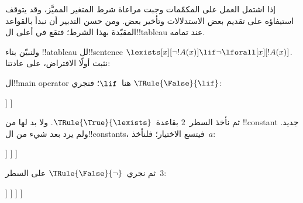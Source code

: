 \documentclass[../../../include/open-logic-section]{subfiles}
\begin{document}


\begin{ex}
إذا اشتمل العمل على المكمّمات وجبت مراعاة شرط المتغير المميَّز،
وقد يتوقف استيفاؤه على تقديم بعض الاستدلالات وتأخير بعض.
ومن حسن التدبير أن نبدأ بالقواعد المقيّدة بهذا الشرط؛ فتقع في أعلى
ال!!{tableau} عند تمامه.

ولنبيّن بناء !!a{tableau} لل!!{sentence}
$\lexists[x][\lnot !A(x)] \lif \lnot \lforall[x][!A(x)]$.
نثبت أولًا الافتراض، على عادتنا:
\begin{oltableau}
[\sFmla{\False}{\lexists[x][\lnot \formula{A}(x)]\lif \lnot
    \lforall[x][\formula{A}(x)]}, just=\TAss]
\end{oltableau}
ال!!{main operator} هنا~$\lif$؛ فنجري
$\TRule{\False}{\lif}$:
\begin{oltableau}
[\sFmla{\False}{\lexists[x][\lnot \formula{A}(x)]\lif \lnot
    \lforall[x][\formula{A}(x)]}, just=\TAss, checked
  [\sFmla{\True}{\lexists[x][\lnot \formula{A}(x)]},
    just={\TRule{\False}{\lif}[1]}
    [\sFmla{\False}{\lnot\lforall[x][\formula{A}(x)]},
      just={\TRule{\False}{\lif}[1]}]
  ]
]
\end{oltableau}
ثم نأخذ السطر~$2$ بقاعدة~$\TRule{\True}{\lexists}$.
ولا بد لها من !!{constant} جديد. ولم يرد بعد شيء من
ال!!{constant}s، فيتسع الاختيار؛ فلنأخذ~$a$:
\begin{oltableau}
[\sFmla{\False}{\lexists[x][\lnot \formula{A}(x)]\lif \lnot
    \lforall[x][\formula{A}(x)]}, just=\TAss, checked
  [\sFmla{\True}{\lexists[x][\lnot \formula{A}(x)]},
    just={\TRule{\False}{\lif}[1]}, checked
    [\sFmla{\False}{\lnot\lforall[x][\formula{A}(x)]},
      just={\TRule{\False}{\lif}[1]}
      [\sFmla{\True}{\lnot\formula{A}(a)}, just={\TRule{\True}{\lexists}[2]}]
    ]
  ]
]
\end{oltableau}
ثم نجري~$\TRule{\False}{\lnot}$ على السطر~$3$:
\begin{oltableau}
[\sFmla{\False}{\lexists[x][\lnot \formula{A}(x)]\lif \lnot
    \lforall[x][\formula{A}(x)]}, just=\TAss, checked
  [\sFmla{\True}{\lexists[x][\lnot \formula{A}(x)]},
    just={\TRule{\False}{\lif}[1]}, checked
    [\sFmla{\False}{\lnot\lforall[x][\formula{A}(x)]},
      just={\TRule{\False}{\lif}[1]}, checked
      [\sFmla{\True}{\lnot\formula{A}(a)}, just={\TRule{\True}{\lexists}[2]}
        [\sFmla{\True}{\lforall[x][\formula{A}(x)]},
          just = {\TRule{\False}{\lnot}[3]}
        ]
      ]
    ]
  ]
]
\end{oltableau}

\end{ex}
\end{document}
